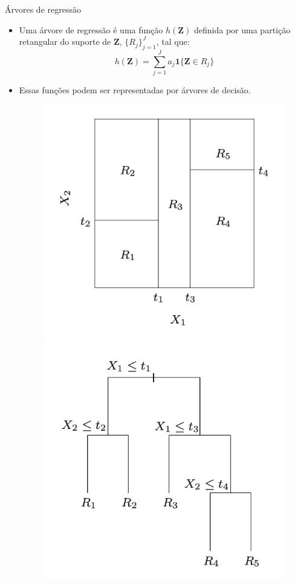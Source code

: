 \documentclass[11pt]{beamer}
\begin{document}
\begin{frame}{Árvores de regressão}
	\begin{itemize}
		\item Uma árvore de regressão é uma função $h(\boldsymbol{Z})$ definida por uma partição retangular do suporte de $\mathbf{Z}$, $\{R_j\}_{j=1}^J$, tal que:
		$$h(\boldsymbol{Z}) = \sum_{j=1}^J a_j \mathbf{1}\{\boldsymbol{Z} \in R_j\}$$
		\item Essas funções podem ser representadas por árvores de decisão.
		
		\begin{figure}
			\includegraphics[scale=0.55]{graficos/particao.png}			\includegraphics[scale=0.55]{graficos/arvore.png}
		\end{figure}
		
	\end{itemize}
\end{frame}
\end{document}
